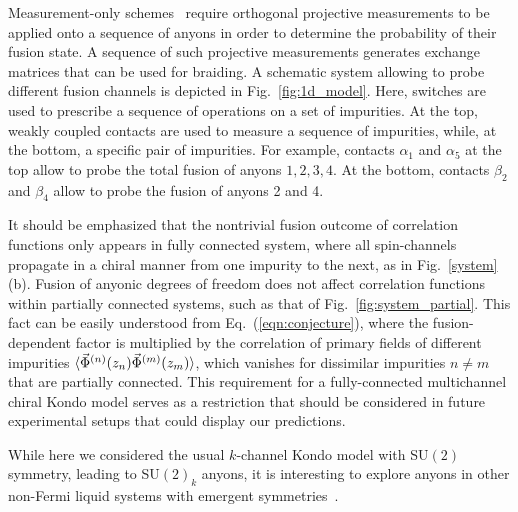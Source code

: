 \documentclass[aps,prb,twocolumn,superscriptaddress]{revtex4-1}
\begin{document}
Measurement-only schemes~\cite{bonderson2008measurement,bonderson2009measurement,bonderson2012non} require orthogonal projective measurements to be applied onto a sequence of anyons in order to determine the probability of their fusion state. A sequence of such projective measurements generates exchange matrices that can be used for braiding. 
A schematic system allowing to probe different fusion channels is  depicted in Fig.~\ref{fig:1d_model}. Here, switches are used to prescribe a sequence of operations on a set of impurities. At the top, weakly coupled contacts are used to measure a sequence of impurities, while, at the bottom, a specific pair of impurities. For example,  contacts $\alpha_1$ and $\alpha_5$ at the top allow to probe the total fusion of anyons $1,2,3,4$. At the bottom, contacts $\beta_2$ and $\beta_4$ allow to probe the fusion of anyons 2 and 4. 

It should be emphasized that the nontrivial fusion outcome of correlation functions only appears in fully connected system, where all spin-channels propagate in a chiral manner from one impurity to the next, as in Fig.~\ref{system}(b). Fusion of anyonic degrees of freedom does not affect correlation functions within partially connected systems, such as that of Fig.~\ref{fig:system_partial}. This fact can be easily understood from Eq.~(\ref{eqn:conjecture}), where the fusion-dependent factor is multiplied by the correlation of primary fields of different impurities $\braket{\vec{\Phi}^{(n)}(z_{n})\vec{\Phi}^{(m)}(z_{m})}$, which vanishes for dissimilar impurities $n\ne m$ that are partially connected. This requirement for a fully-connected multichannel chiral Kondo model serves as a restriction that should be considered in future experimental setups that could display our predictions.

While here we considered the usual $k$-channel Kondo model with SU$(2)$ symmetry, leading to SU$(2)_k$ anyons, it is interesting to explore anyons in other non-Fermi liquid systems with  emergent symmetries~\cite{ingersent2005kondo,lopez20133,keller2014emergent,mitchell2021so,liberman2021so}.

\end{document}
